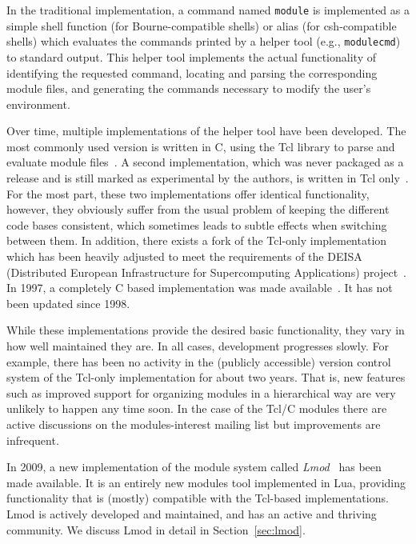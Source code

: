 In the traditional implementation, a command named \texttt{module}
is implemented as a simple shell function (for Bourne-compatible shells) or
alias (for csh-compatible shells) which evaluates the commands printed by a
helper tool (e.g., \texttt{modulecmd}) to standard output. This helper tool
implements the actual functionality of identifying the requested command,
locating and parsing the corresponding module files, and generating the
commands necessary to modify the user's environment.

Over time, multiple implementations of the helper tool
have been developed. The most commonly used version is written in C, using the Tcl
library to parse and evaluate module files~\cite{em}. A second implementation, which
was never packaged as a release and is still marked as experimental by the
authors, is written in Tcl only~\cite{em}. For the most part, these two implementations
offer identical functionality, however, they obviously suffer from the usual
problem of keeping the different code bases consistent, which sometimes leads
to subtle effects when switching between them. In addition, there exists a
fork of the Tcl-only implementation which has been heavily adjusted to meet
the requirements of the DEISA (Distributed European Infrastructure for
Supercomputing Applications) project~\cite{wikiDEISA}.  In
1997, a completely C based implementation was made
available~\cite{cmod}.  It has not been updated since 1998.


While these implementations provide the desired basic functionality, they
vary in how well maintained they are. In all cases, development
progresses slowly. For example, there has been no activity in the
(publicly accessible) version control system of the Tcl-only
implementation for about two years. That is, new features such as
improved support for organizing modules in a hierarchical way are very
unlikely to happen any time soon. In the case of the Tcl/C modules
there are active discussions on the modules-interest mailing list but
improvements are infrequent.

In 2009, a new implementation of the module system called
\emph{Lmod}~\cite{taccLmod} has
been made available. It is an entirely new modules tool implemented in
Lua, providing functionality that is (mostly) compatible with the Tcl-based
implementations.  Lmod is actively developed and maintained, and has
an active and thriving community. We discuss Lmod in detail in
Section~\ref{sec:lmod}.

